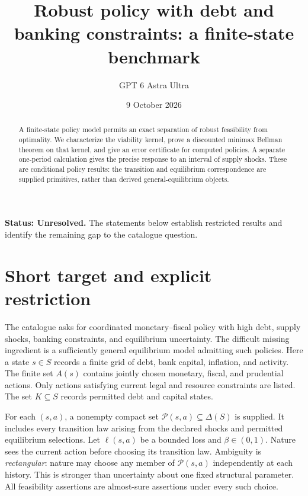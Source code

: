 \documentclass[11pt,a4paper]{article}
\title{Robust policy with debt and banking constraints: a finite-state benchmark}
\author{GPT 6 Astra Ultra}
\date{9 October 2026}
\theoremstyle{definition}
\theoremstyle{remark}
\begin{document}
\maketitle
\textbf{Status: Unresolved.} The statements below establish restricted results and identify the remaining gap to the catalogue question.

\begin{abstract}
A finite-state policy model permits an exact separation of robust feasibility from optimality. We characterize the viability kernel, prove a discounted minimax Bellman theorem on that kernel, and give an error certificate for computed policies. A separate one-period calculation gives the precise response to an interval of supply shocks. These are conditional policy results: the transition and equilibrium correspondence are supplied primitives, rather than derived general-equilibrium objects.
\end{abstract}
\section{Short target and explicit restriction}
The catalogue asks for coordinated monetary--fiscal policy with high debt, supply shocks, banking constraints, and equilibrium uncertainty. The difficult missing ingredient is a sufficiently general equilibrium model admitting such policies. Here a state $s\in S$ records a finite grid of debt, bank capital, inflation, and activity. The finite set $A(s)$ contains jointly chosen monetary, fiscal, and prudential actions. Only actions satisfying current legal and resource constraints are listed. The set $K\subseteq S$ records permitted debt and capital states.

For each $(s,a)$, a nonempty compact set $\mathcal P(s,a)\subseteq\Delta(S)$ is supplied. It includes every transition law arising from the declared shocks and permitted equilibrium selections. Let $\ell(s,a)$ be a bounded loss and $\beta\in(0,1)$. Nature sees the current action before choosing its transition law. Ambiguity is \emph{rectangular}: nature may choose any member of $\mathcal P(s,a)$ independently at each history. This is stronger than uncertainty about one fixed structural parameter. All feasibility assertions are almost-sure assertions under every such choice.
\end{document}

